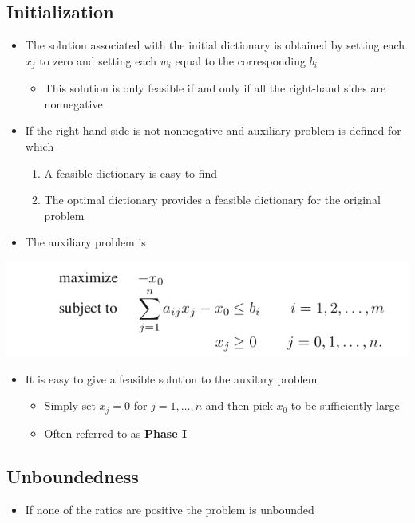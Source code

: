 \documentclass[11pt]{article}
\begin{document}
\subsection{Initialization}
\label{sec:org6ad8b86}
\begin{itemize}
\item The solution associated with the initial dictionary is obtained by setting each \(x_j\) to zero and setting each \(w_i\) equal to the corresponding \(b_i\)
\begin{itemize}
\item This solution is only feasible if and only if all the right-hand sides are nonnegative
\end{itemize}

\item If the right hand side is not nonnegative and auxiliary problem is defined for which 
\begin{enumerate}
\item A feasible dictionary is easy to find
\item The optimal dictionary provides a feasible dictionary for the original problem
\end{enumerate}

\item The auxiliary problem is
\end{itemize}
\begin{center}
\includegraphics[width=.9\linewidth]{The Simplex Method/screenshot_2019-01-28_09-59-24.png}
\end{center}
\begin{itemize}
\item It is easy to give a feasible solution to the auxilary problem
\begin{itemize}
\item Simply set \(x_j = 0\) for \(j=1, \dots, n\) and then pick \(x_0\) to be sufficiently large
\item Often referred to as \textbf{Phase I}
\end{itemize}
\end{itemize}

\subsection{Unboundedness}
\label{sec:orgc2a507c}
\begin{itemize}
\item If none of the ratios are positive the problem is unbounded
\end{itemize}
\end{document}
